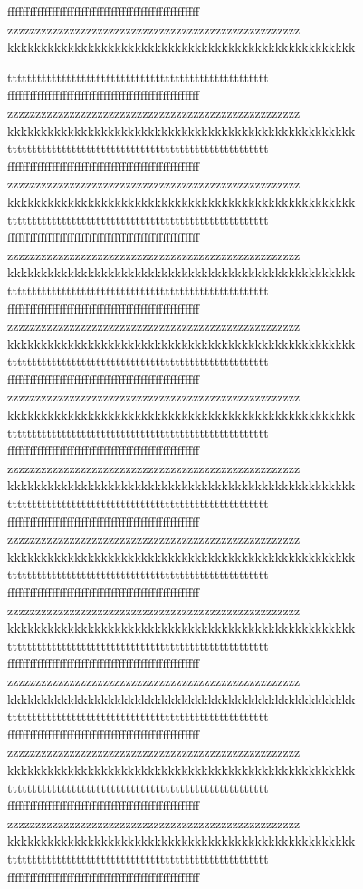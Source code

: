 \documentclass[a4paper,12pt,landscape,twocolumn]{book}
\begin{document}
ffffffffffffffffffffffffffffffffffffffffffffffffffff
zzzzzzzzzzzzzzzzzzzzzzzzzzzzzzzzzzzzzzzzzzzzzzzzzzzz
kkkkkkkkkkkkkkkkkkkkkkkkkkkkkkkkkkkkkkkkkkkkkkkkkkkk

ttttttttttttttttttttttttttttttttttttttttttttttttttttt
ffffffffffffffffffffffffffffffffffffffffffffffffffff
zzzzzzzzzzzzzzzzzzzzzzzzzzzzzzzzzzzzzzzzzzzzzzzzzzzz
kkkkkkkkkkkkkkkkkkkkkkkkkkkkkkkkkkkkkkkkkkkkkkkkkkkk
ttttttttttttttttttttttttttttttttttttttttttttttttttttt
ffffffffffffffffffffffffffffffffffffffffffffffffffff
zzzzzzzzzzzzzzzzzzzzzzzzzzzzzzzzzzzzzzzzzzzzzzzzzzzz
kkkkkkkkkkkkkkkkkkkkkkkkkkkkkkkkkkkkkkkkkkkkkkkkkkkk
ttttttttttttttttttttttttttttttttttttttttttttttttttttt
ffffffffffffffffffffffffffffffffffffffffffffffffffff
zzzzzzzzzzzzzzzzzzzzzzzzzzzzzzzzzzzzzzzzzzzzzzzzzzzz
kkkkkkkkkkkkkkkkkkkkkkkkkkkkkkkkkkkkkkkkkkkkkkkkkkkk
ttttttttttttttttttttttttttttttttttttttttttttttttttttt
ffffffffffffffffffffffffffffffffffffffffffffffffffff
zzzzzzzzzzzzzzzzzzzzzzzzzzzzzzzzzzzzzzzzzzzzzzzzzzzz
kkkkkkkkkkkkkkkkkkkkkkkkkkkkkkkkkkkkkkkkkkkkkkkkkkkk
ttttttttttttttttttttttttttttttttttttttttttttttttttttt
ffffffffffffffffffffffffffffffffffffffffffffffffffff
zzzzzzzzzzzzzzzzzzzzzzzzzzzzzzzzzzzzzzzzzzzzzzzzzzzz
kkkkkkkkkkkkkkkkkkkkkkkkkkkkkkkkkkkkkkkkkkkkkkkkkkkk
ttttttttttttttttttttttttttttttttttttttttttttttttttttt
ffffffffffffffffffffffffffffffffffffffffffffffffffff
zzzzzzzzzzzzzzzzzzzzzzzzzzzzzzzzzzzzzzzzzzzzzzzzzzzz
kkkkkkkkkkkkkkkkkkkkkkkkkkkkkkkkkkkkkkkkkkkkkkkkkkkk
ttttttttttttttttttttttttttttttttttttttttttttttttttttt
ffffffffffffffffffffffffffffffffffffffffffffffffffff
zzzzzzzzzzzzzzzzzzzzzzzzzzzzzzzzzzzzzzzzzzzzzzzzzzzz
kkkkkkkkkkkkkkkkkkkkkkkkkkkkkkkkkkkkkkkkkkkkkkkkkkkk
ttttttttttttttttttttttttttttttttttttttttttttttttttttt
ffffffffffffffffffffffffffffffffffffffffffffffffffff
zzzzzzzzzzzzzzzzzzzzzzzzzzzzzzzzzzzzzzzzzzzzzzzzzzzz
kkkkkkkkkkkkkkkkkkkkkkkkkkkkkkkkkkkkkkkkkkkkkkkkkkkk
ttttttttttttttttttttttttttttttttttttttttttttttttttttt
ffffffffffffffffffffffffffffffffffffffffffffffffffff
zzzzzzzzzzzzzzzzzzzzzzzzzzzzzzzzzzzzzzzzzzzzzzzzzzzz
kkkkkkkkkkkkkkkkkkkkkkkkkkkkkkkkkkkkkkkkkkkkkkkkkkkk
ttttttttttttttttttttttttttttttttttttttttttttttttttttt
ffffffffffffffffffffffffffffffffffffffffffffffffffff
zzzzzzzzzzzzzzzzzzzzzzzzzzzzzzzzzzzzzzzzzzzzzzzzzzzz
kkkkkkkkkkkkkkkkkkkkkkkkkkkkkkkkkkkkkkkkkkkkkkkkkkkk
ttttttttttttttttttttttttttttttttttttttttttttttttttttt
ffffffffffffffffffffffffffffffffffffffffffffffffffff
zzzzzzzzzzzzzzzzzzzzzzzzzzzzzzzzzzzzzzzzzzzzzzzzzzzz
kkkkkkkkkkkkkkkkkkkkkkkkkkkkkkkkkkkkkkkkkkkkkkkkkkkk
ttttttttttttttttttttttttttttttttttttttttttttttttttttt
ffffffffffffffffffffffffffffffffffffffffffffffffffff
\end{document}
